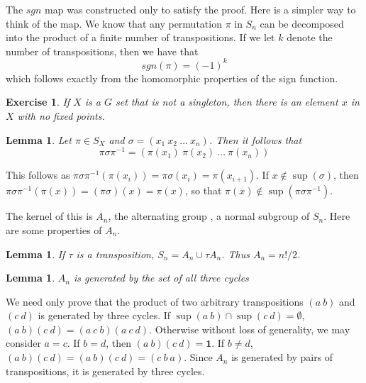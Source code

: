\documentclass[12pt]{amsbook}
\makeatletter
\theoremstyle{plain}
\newtheorem{lemma}[theorem]{Lemma}
\newtheorem{exercise}{Exercise}
\theoremstyle{definition}
\renewenvironment{proof}[1][\proofname]{\par
  \pushQED{\qed}%
  \normalfont \topsep6\p@\@plus6\p@\relax
  \list{}{\leftmargin=0em
          \rightmargin=\leftmargin
          \settowidth{\itemindent}{\itshape#1}%
          \labelwidth=\itemindent}

  \item[\hskip\labelsep
        \itshape
    #1\@addpunct{.}]\ignorespaces
}{%
  \popQED\endlist\@endpefalse
}
\makeatother
\begin{document}
The $sgn$ map was constructed only to satisfy the proof. Here is a simpler way to think of the map. We know that any permutation $\pi$ in $S_n$ can be decomposed into the product of a finite number of transpositions. If we let $k$ denote the number of transpositions, then we have that
%
\[ sgn(\pi) = (-1)^k \]
%
which follows exactly from the homomorphic properties of the sign function.

\begin{exercise}
    If $X$ is a $G$ set that is not a singleton, then there is an element $x$ in $X$ with no fixed points.
\end{exercise}










\begin{lemma}
    Let $\pi \in S_X$ and $\sigma = (x_1\ x_2\ \dots\ x_n)$. Then it follows that
    \[\pi \sigma \pi^{-1} = (\pi(x_1)\ \pi(x_2)\ \dots\ \pi(x_n))\]
\end{lemma}
\begin{proof}
    This follows as $\pi \sigma \pi^{-1} (\pi(x_i)) = \pi \sigma(x_i) = \pi(x_{i+1})$. If $x \notin \sup(\sigma)$, then $\pi \sigma \pi^{-1} (\pi (x)) = (\pi \sigma) (x) = \pi(x)$, so that $\pi(x) \notin \sup(\pi \sigma \pi^{-1})$.
\end{proof}

The kernel of this is $A_n$, the alternating group , a normal subgroup of $S_n$. Here are some properties of $A_n$.

\begin{lemma} If $\tau$ is a transposition, $S_n = A_n \cup \tau A_n$. Thus $A_n = n!/2$. \end{lemma}

\begin{lemma} $A_n$ is generated by the set of all three cycles \end{lemma}
\begin{proof}
    We need only prove that the product of two arbitrary transpositions $(a\ b)$ and $(c\ d)$ is generated by three cycles. If $\sup(a\ b) \cap \sup(c\ d) = \emptyset$, $(a\ b)(c\ d) = (a\ c\ b)(a\ c\ d)$. Otherwise without loss of generality, we may consider $a = c$. If $b = d$, then $(a\ b)(c\ d) = \mathbf{1}$. If $b \neq d$, $(a\ b)(c\ d) = (a\ b)(c\ d) = (c\ b\ a)$. Since $A_n$ is generated by pairs of transpositions, it is generated by three cycles.
\end{proof}
\end{document}
